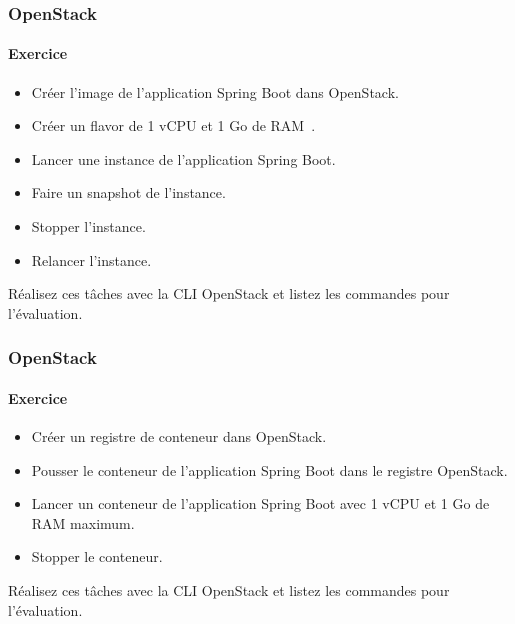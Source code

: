 \documentclass{beamer}
\begin{document}
    \begin{frame}
        \transdissolve
        \frametitle{OpenStack}
        \framesubtitle{Exercice}
        \begin{itemize}
            \item Créer l'image de l'application Spring Boot dans OpenStack.
            \item Créer un flavor de 1 vCPU et 1 Go de RAM~.
            \item Lancer une instance de l'application Spring Boot.
            \item Faire un snapshot de l'instance.
            \item Stopper l'instance.
            \item Relancer l'instance.
        \end{itemize}
        Réalisez ces tâches avec la CLI OpenStack et listez les commandes pour l'évaluation.
    \end{frame}

    \begin{frame}
        \transdissolve
        \frametitle{OpenStack}
        \framesubtitle{Exercice}
        \begin{itemize}
            \item Créer un registre de conteneur dans OpenStack.
            \item Pousser le conteneur de l'application Spring Boot dans le registre OpenStack.
            \item Lancer un conteneur de l'application Spring Boot avec 1 vCPU et 1 Go de RAM maximum.
            \item Stopper le conteneur.
        \end{itemize}
        Réalisez ces tâches avec la CLI OpenStack et listez les commandes pour l'évaluation.
    \end{frame}
\end{document}
